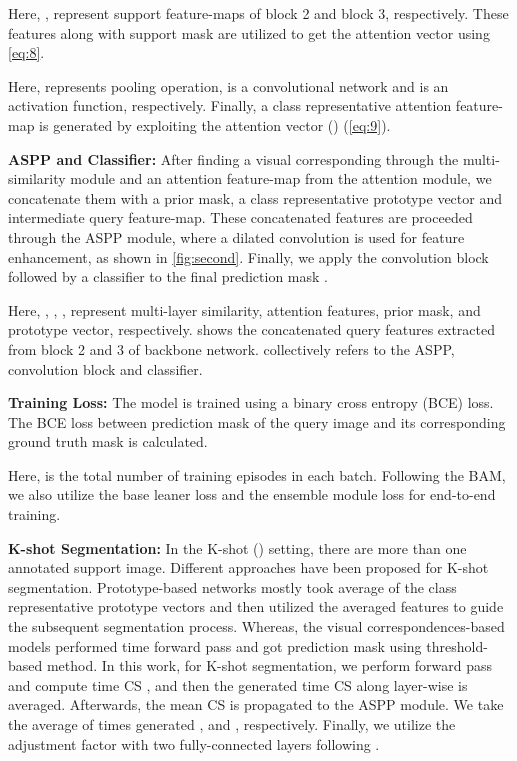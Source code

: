 \documentclass[10pt,twocolumn,letterpaper]{article}
\begin{document}
Here, ,  represent support feature-maps of block 2 and block 3, respectively. These features along with support mask  are utilized to get the attention vector using \cref{eq:8}.

Here,  represents pooling operation,  is a convolutional network and  is an activation function, respectively. Finally, a class representative attention feature-map is generated by exploiting the attention vector () (\cref{eq:9}).


\textbf{ASPP and Classifier:} After finding a visual corresponding through the multi-similarity module and an attention feature-map from the attention module, we concatenate them with a prior mask, a class representative prototype vector and intermediate query feature-map. These concatenated features are proceeded through the ASPP module, where a dilated convolution is used for feature enhancement, as shown in \cref{fig:second}. Finally, we apply the convolution block followed by a classifier to the final prediction mask . 

Here, , , ,  represent multi-layer similarity, attention features, prior mask, and prototype vector, respectively.  shows the concatenated query features extracted from block 2 and 3 of backbone network.  collectively refers to the ASPP, convolution block and classifier.

\textbf{Training Loss:}
The model is trained using a binary cross entropy (BCE) loss. The BCE loss between prediction mask  of the query image and its corresponding ground truth mask  is calculated.

Here,  is the total number of training episodes in each batch. Following the BAM, we also utilize the base leaner loss and the ensemble module loss for end-to-end training.

\textbf{K-shot Segmentation:}
In the K-shot () setting, there are more than one annotated support image. Different approaches have been proposed for K-shot segmentation. Prototype-based networks \cite{FSS2PFE,FSS19sg,FSS17prototypical} mostly took average of the  class representative prototype vectors and then utilized the averaged features to guide the subsequent segmentation process. Whereas, the visual correspondences-based models \cite{FSS9Hsnet} performed  time forward pass and got prediction mask using threshold-based method. In this work, for K-shot segmentation, we perform  forward pass and compute  time CS , and then the generated  time CS along layer-wise is averaged. Afterwards, the mean CS  is propagated to the ASPP module. We take the average of  times generated , and , respectively. Finally, we utilize the adjustment factor with two fully-connected layers following \cite{BAM}.
\end{document}
